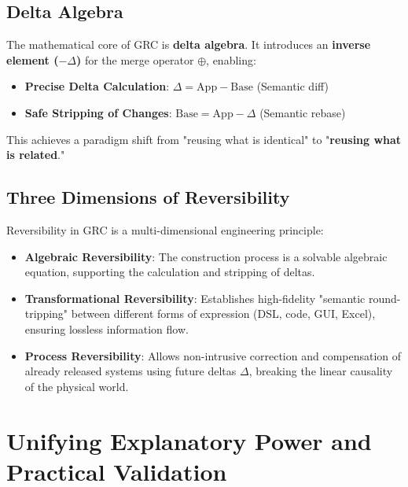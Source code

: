 \documentclass[11pt]{article}
\begin{document}
\subsection{Delta Algebra}
The mathematical core of GRC is \textbf{delta algebra}. It introduces an \textbf{inverse element ($-\Delta$)} for the merge operator $\oplus$, enabling:
\begin{itemize}
    \item \textbf{Precise Delta Calculation}: $\Delta = \text{App} - \text{Base}$ (Semantic diff)
    \item \textbf{Safe Stripping of Changes}: $\text{Base} = \text{App} - \Delta$ (Semantic rebase)
\end{itemize}
This achieves a paradigm shift from "reusing what is identical" to "\textbf{reusing what is related}."

\subsection{Three Dimensions of Reversibility}
Reversibility in GRC is a multi-dimensional engineering principle:
\begin{itemize}
    \item \textbf{Algebraic Reversibility}: The construction process is a solvable algebraic equation, supporting the calculation and stripping of deltas.
    \item \textbf{Transformational Reversibility}: Establishes high-fidelity "semantic round-tripping" between different forms of expression (DSL, code, GUI, Excel), ensuring lossless information flow.
    \item \textbf{Process Reversibility}: Allows non-intrusive correction and compensation of already released systems using future deltas $\Delta$, breaking the linear causality of the physical world.
\end{itemize}

\section{Unifying Explanatory Power and Practical Validation}
\end{document}
